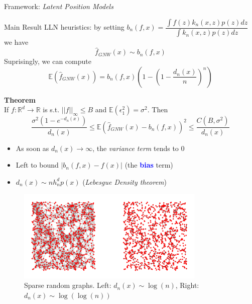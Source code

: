 \documentclass[final,dvipsnames]{beamer}
\newcommand{\myemphh}[1]{\textbf{\textcolor{blue}{#1}}}
\newcommand{\mycolbackwhite}[1]{
\hspace*{.01\linewidth}\begin{minipage}{.96\linewidth}
\begin{mdframed}[backgroundcolor=white!10,linewidth=3pt]
\vspace{10pt}
#1
\vspace{10pt}
\end{mdframed}
\end{minipage}
}
\begin{document}
\begin{frame}
\begin{columns}[T]
\begin{column}{0.48\textwidth}
\begin{block}{Framework: \textit{Latent Position Models}}
\end{block}
\begin{block}{Main Result}
LLN heuristics: by setting $b_n(f,x)=\dfrac{\int f(z)k_n(x,z)p(z)dz}{\int k_n(x,z)p(z)dz}$ we have 
\begin{equation*}
    \hat{f}_{GNW}(x)\sim b_n(f,x)
\end{equation*}
\vspace{10pt}
Suprisingly, we can compute
\begin{equation*}
    \mathbb{E}(\hat{f}_{GNW}(x))=b_n(f,x)(1-(1-\frac{d_n(x)}{n})^n)
\end{equation*}

\mycolbackwhite{\textbf{Theorem}
    \vspace{20pt}
    \\
    If $f\colon\mathbb{R}^d\to\mathbb{R}$ is s.t. $||f||_{\infty}\leq B$ and $\mathbb{E}(\epsilon_1^2)=\sigma^2$. 
    Then
    \begin{equation*}
        \frac{\sigma^2(1-e^{-d_n(x)})}{d_n(x)}\leq \mathbb{E}(\hat{f}_{GNW}(x)-b_n(f,x))^2\leq \frac{C(B,\sigma^2)}{d_n(x)}
    \end{equation*}
    }
    \vspace{20pt}
    \begin{itemize}
        \item  As soon as $d_n(x)\to\infty$, the \textit{variance term} tends to $0$ 
        \item  Left to bound $|b_n(f,x)-f(x)|$ (the \myemphh{bias} term) %
        \item  $d_n(x)\sim nh_n^dp(x)$ (\textit{Lebesgue Density theorem})
    \end{itemize}
    \begin{figure}
        \centering
        \includegraphics[width=0.8\textwidth]{fresh_for_marseille.png}
        \caption{Sparse random graphs. Left: $d_n(x)\sim\log(n)$, Right: $d_n(x)\sim\log(\log(n))$}
    \end{figure}
\end{block}
\end{column}


\end{columns}
\end{frame}
\end{document}
